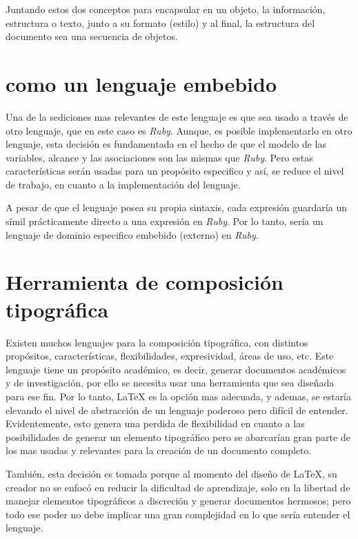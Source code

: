 \documentclass[12pt,letterpaper,titlepage,oneside,openright]{book}
\newcommand{\OhTeX}{%
    \makebox[0.76em][c]{O}%
    \makebox[0.25em][c]{%
        \raisebox{0.14em}[0em][0em]{%
            \fontsize{0.5em}{0cm}%
                \selectfont H%
        }%
    }%
    \makebox[1.35em][c]{\TeX}%
}
\newcommand{\latex}{\LaTeX\xspace}
\newcommand{\ohtex}{\OhTeX\xspace}
\newcommand{\ruby}{\textit{Ruby}\xspace}
\begin{document}
Juntando estos dos conceptos para encapsular en un objeto, la información,
estructura o texto, junto a su formato (estilo) y al final, la estructura del
documento sea una secuencia de objetos.

\section[OhTeX como un lenguaje embebido]{\ohtex como un lenguaje embebido}

Una de la sediciones mas relevantes de este lenguaje es que sea usado a través
de otro lenguaje, que en este caso es \ruby. Aunque, es posible implementarlo en
otro lenguaje, esta decisión es fundamentada en el hecho de que el modelo de las
variables, alcance y las asociaciones son las mismas que \ruby. Pero estas
características serán usadas para un propósito especifico y así, se reduce el
nivel de trabajo, en cuanto a la implementación del lenguaje.

A pesar de que el lenguaje posea su propia sintaxis, cada expresión guardaría un
símil prácticamente directo a una expresión en \ruby. Por lo tanto, \ohtex sería
un lenguaje de dominio especifico embebido (externo) en \ruby.

\section{Herramienta de composición tipográfica}

Existen muchos lenguajes para la composición tipográfica, con distintos
propósitos, características, flexibilidades, expresividad, áreas de uso, etc.
Este lenguaje tiene un propósito académico, es decir, generar documentos
académicos y de investigación, por ello se necesita usar una herramienta que sea
diseñada para ese fin. Por lo tanto, \latex es la opción mas adecuada, y ademas,
se estaría elevando el nivel de abstracción de un lenguaje poderoso pero difícil
de entender. Evidentemente, esto genera una perdida de flexibilidad en cuanto a
las posibilidades de generar un elemento tipográfico pero se abarcarían gran
parte de los mas usadas y relevantes para la creación de un documento completo.

También, esta decisión es tomada porque al momento del diseño de \latex, su
creador no se enfocó en reducir la dificultad de aprendizaje, solo en la libertad
de manejar elementos tipográficos a discreción y generar documentos hermosos;
pero todo ese poder no debe implicar una gran complejidad en lo que sería
entender el lenguaje.
\end{document}
